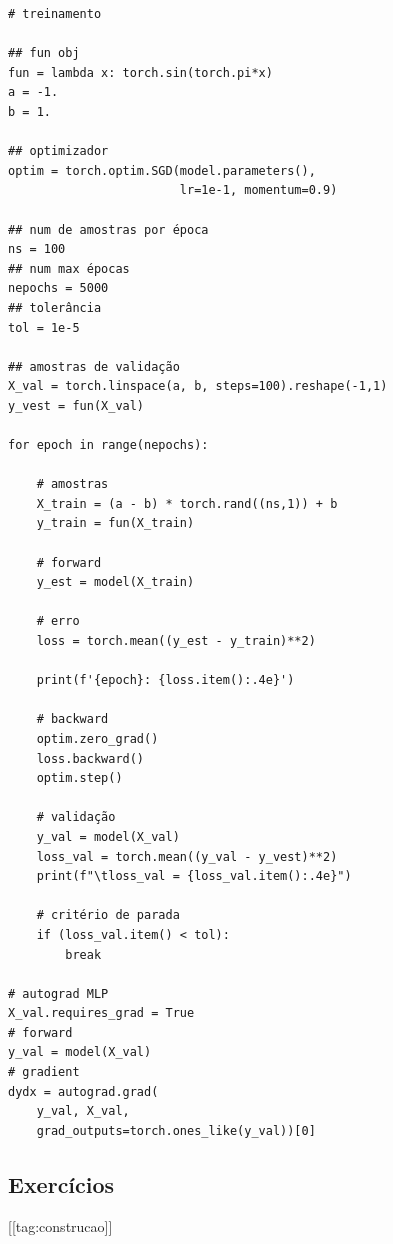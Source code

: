 \begin{ex}
\begin{lstlisting}[caption=mlp\_autograd\_apfun1d.py]
# treinamento

## fun obj
fun = lambda x: torch.sin(torch.pi*x)
a = -1.
b = 1.

## optimizador
optim = torch.optim.SGD(model.parameters(),
                        lr=1e-1, momentum=0.9)

## num de amostras por época
ns = 100
## num max épocas
nepochs = 5000
## tolerância
tol = 1e-5

## amostras de validação
X_val = torch.linspace(a, b, steps=100).reshape(-1,1)
y_vest = fun(X_val)

for epoch in range(nepochs):

    # amostras
    X_train = (a - b) * torch.rand((ns,1)) + b
    y_train = fun(X_train)
    
    # forward
    y_est = model(X_train)

    # erro
    loss = torch.mean((y_est - y_train)**2)

    print(f'{epoch}: {loss.item():.4e}')

    # backward
    optim.zero_grad()
    loss.backward()
    optim.step()

    # validação
    y_val = model(X_val)
    loss_val = torch.mean((y_val - y_vest)**2)
    print(f"\tloss_val = {loss_val.item():.4e}")
    
    # critério de parada
    if (loss_val.item() < tol):
        break

# autograd MLP
X_val.requires_grad = True
# forward
y_val = model(X_val)
# gradient
dydx = autograd.grad(
    y_val, X_val,
    grad_outputs=torch.ones_like(y_val))[0]
\end{lstlisting}
\end{ex}

\subsection{Exercícios}
[[tag:construcao]]
